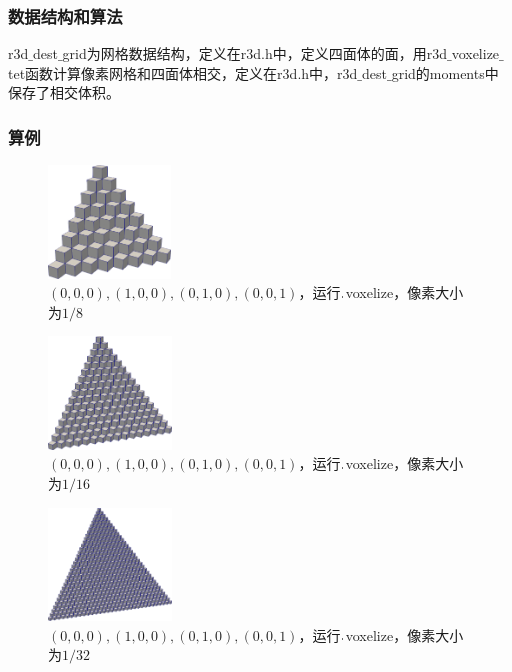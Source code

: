 \subsubsection{数据结构和算法}
r3d$\_$dest$\_$grid为网格数据结构，定义在r3d.h中，定义四面体的面，用r3d$\_$voxelize$\_$tet函数计算像素网格和四面体相交，定义在r3d.h中，r3d$\_$dest$\_$grid的moments中保存了相交体积。

\subsubsection{算例}

\begin{figure}[!htbp]
  \centering
  \includegraphics[height=3cm]{fig/1/1.2/1.png}
  \caption{$(0,0,0),(1,0,0),(0,1,0),(0,0,1)$，运行$.\\$voxelize，像素大小为$1/8$}
  \label{fig:1-7}
\end{figure}

\begin{figure}[!htbp]
  \centering
  \includegraphics[height=3cm]{fig/1/1.2/2.png}
  \caption{$(0,0,0),(1,0,0),(0,1,0),(0,0,1)$，运行$.\\$voxelize，像素大小为$1/16$}
  \label{fig:1-7}
\end{figure}

\begin{figure}[!htbp]
  \centering
  \includegraphics[height=3cm]{fig/1/1.2/3.png}
    \caption{$(0,0,0),(1,0,0),(0,1,0),(0,0,1)$，运行$.\\$voxelize，像素大小为$1/32$}
  \label{fig:1-7}
\end{figure}

